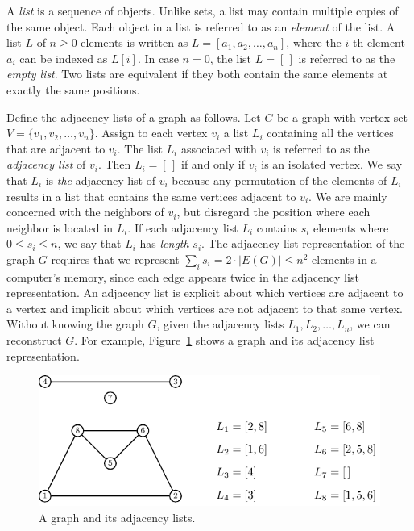 A \emph{list} is a sequence of objects. Unlike
sets, a list may contain multiple copies of the same
object. Each object in a list is referred to as an
\emph{element} of the list. A list $L$ of
$n \geq 0$ elements is written as $L = [a_1, a_2, \dots, a_n]$, where
the $i$-th element $a_i$ can be indexed as $L[i]$. In case $n = 0$,
the list $L = [\,]$ is referred to as the
\emph{empty list}. Two lists are equivalent if they
both contain the same elements at exactly the same positions.

Define the adjacency lists of a graph as
follows. Let $G$ be a graph with vertex set
$V = \{v_1, v_2, \dots, v_n\}$. Assign to each vertex $v_i$ a list
$L_i$ containing all the vertices that are adjacent to $v_i$. The list
$L_i$ associated with $v_i$ is referred to as the
\emph{adjacency list} of $v_i$. Then
$L_i = [\,]$ if and only if $v_i$ is an isolated
vertex. We say that $L_i$ is \emph{the}
adjacency list of $v_i$ because any permutation of the elements of
$L_i$ results in a list that contains the same vertices adjacent to
$v_i$. We are mainly concerned with the neighbors of $v_i$, but
disregard the position where each neighbor is located in $L_i$. If
each adjacency list $L_i$ contains $s_i$
elements where $0 \leq s_i \leq n$, we say that $L_i$ has
\emph{length} $s_i$. The adjacency list
representation of the graph $G$ requires that we represent
$\sum_i s_i = 2 \cdot |E(G)| \leq n^2$ elements in a computer's
memory, since each edge appears twice in the adjacency list
representation. An adjacency list is explicit
about which vertices are adjacent to a vertex and implicit about
which vertices are not adjacent to that same vertex. Without knowing
the graph $G$, given the adjacency lists $L_1, L_2, \dots, L_n$, we
can reconstruct $G$. For example,
Figure~\ref{fig:graph_algorithms:graph_adjacency_lists} shows a graph
and its adjacency list representation.

\begin{figure}[!htbp]
\centering
{}
\includegraphics{image/graph-algorithms/graph-adjacency-lists}
\caption{A graph and its adjacency lists.}
\label{fig:graph_algorithms:graph_adjacency_lists}
\end{figure}

